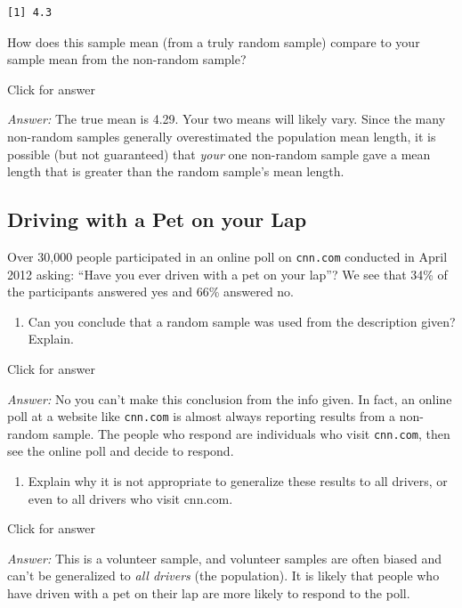 \documentclass[
]{book}
\providecommand{\tightlist}{%
  \setlength{\itemsep}{0pt}\setlength{\parskip}{0pt}}
\begin{document}
\begin{verbatim}
[1] 4.3
\end{verbatim}

How does this sample mean (from a truly random sample) compare to your sample mean from the non-random sample?

Click for answer

\emph{Answer:} The true mean is 4.29. Your two means will likely vary. Since the many non-random samples generally overestimated the population mean length, it is possible (but not guaranteed) that \emph{your} one non-random sample gave a mean length that is greater than the random sample's mean length.

\hypertarget{driving-with-a-pet-on-your-lap}{%
\subsection{Driving with a Pet on your Lap}\label{driving-with-a-pet-on-your-lap}}

Over 30,000 people participated in an online poll on \texttt{cnn.com} conducted in April 2012 asking: ``Have you ever driven with a pet on your lap''? We see that 34\% of the participants answered yes and 66\% answered no.

\begin{enumerate}
\def\labelenumi{\alph{enumi}.}
\tightlist
\item
  Can you conclude that a random sample was used from the description given? Explain.
\end{enumerate}

Click for answer

\emph{Answer:} No you can't make this conclusion from the info given. In fact, an online poll at a website like \texttt{cnn.com} is almost always reporting results from a non-random sample. The people who respond are individuals who visit \texttt{cnn.com}, then see the online poll and decide to respond.

\begin{enumerate}
\def\labelenumi{\alph{enumi}.}
\setcounter{enumi}{1}
\tightlist
\item
  Explain why it is not appropriate to generalize these results to all drivers, or even to all drivers who visit cnn.com.
\end{enumerate}

Click for answer

\emph{Answer:} This is a volunteer sample, and volunteer samples are often biased and can't be generalized to \emph{all drivers} (the population). It is likely that people who have driven with a pet on their lap are more likely to respond to the poll.
\end{document}

